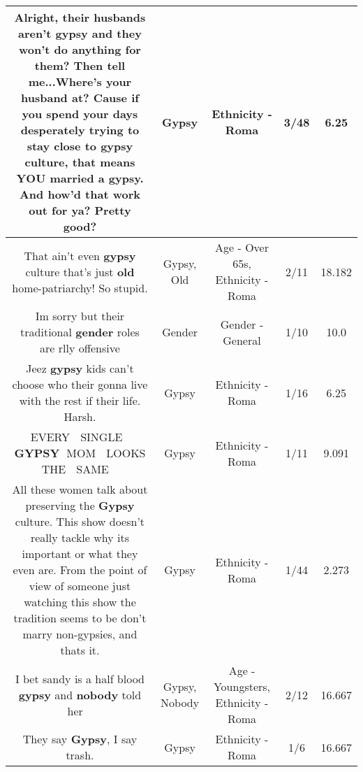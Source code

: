 \documentclass[11pt]{article}
\newlength\mylength
\begin{document}
\begin{center}
\begin{longtable}{|C{.65\mylength}|C{.30\mylength}|C{.12\mylength}|C{.12\mylength}|C{.12\mylength}|}
  \small Alright, their husbands aren't \textbf{gypsy} and they won't do anything for them? Then tell me...Where's your husband at? Cause if you spend your days desperately trying to stay close to \textbf{gypsy} culture, that means YOU married a \textbf{gypsy}. And how'd that work out for ya? Pretty good?\normalsize   & Gypsy & Ethnicity - Roma & 3/48 & 6.25 \\  \hline
  \small That ain't even \textbf{gypsy} culture that's just \textbf{old} home-patriarchy! So stupid.\normalsize   & Gypsy, Old & Age - Over 65s, Ethnicity - Roma & 2/11 & 18.182 \\  \hline
  \small Im sorry but their traditional \textbf{gender} roles are rlly offensive\normalsize   & Gender & Gender - General & 1/10 & 10.0 \\  \hline
  \small Jeez \textbf{gypsy} kids can't choose who their gonna live with the rest if their life. Harsh.\normalsize   & Gypsy & Ethnicity - Roma & 1/16 & 6.25 \\  \hline
  \small EVERY 👏 SINGLE 👏 \textbf{GYPSY} 👏MOM 👏 LOOKS 👏THE 👏 SAME👏👏👏👏\normalsize   & Gypsy & Ethnicity - Roma & 1/11 & 9.091 \\  \hline
  \small All these women talk about preserving the \textbf{Gypsy} culture. This show doesn't really tackle why its important or what they even are. From the point of view of someone just watching this show the tradition seems to be don't marry non-gypsies, and thats it.\normalsize   & Gypsy & Ethnicity - Roma & 1/44 & 2.273 \\  \hline
  \small I bet sandy is a half blood \textbf{gypsy} and \textbf{nobody} told her🧐🧐🧐\normalsize   & Gypsy, Nobody & Age - Youngsters, Ethnicity - Roma & 2/12 & 16.667 \\  \hline
  \small They say \textbf{Gypsy}, I say trash.\normalsize   & Gypsy & Ethnicity - Roma & 1/6 & 16.667 \\  \hline

\end{longtable}
\end{center}
\end{document}
